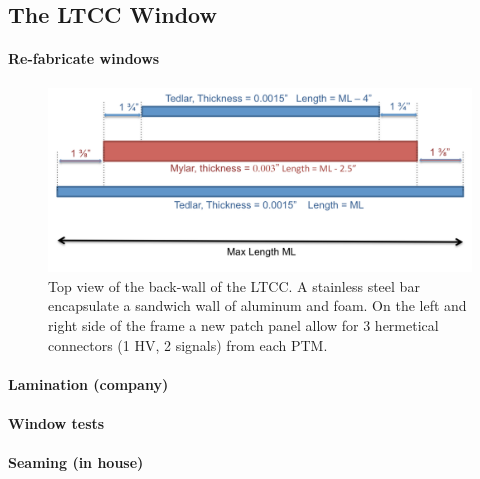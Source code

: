 \subsection{The LTCC Window}


\paragraph{Re-fabricate windows}

\begin{figure}[h]
	\centering
	\includegraphics[width=1.0\columnwidth,keepaspectratio]{img/windowDesign.png}
	\caption{Top view of the back-wall of the LTCC. A stainless steel bar encapsulate a sandwich wall of aluminum and foam. On the left and right side
				 of the frame a new patch panel allow for 3 hermetical connectors (1 HV, 2 signals) from each PTM. }
	\label{fig:windowDesign}
\end{figure}



\paragraph{Lamination (company)}


\paragraph{Window tests}



\paragraph{Seaming (in house)}


